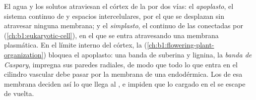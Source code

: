 \begin{definition}\label{def:b1:plant-water-minerals:pathways}
El agua y los solutos atraviesan el córtex de la  por dos vías: el
\emph{apoplasto}, el sistema continuo de  y espacios
intercelulares, por el que se desplazan sin atravesar ninguna membrana; y el
\emph{simplasto}, el  continuo de las  conectadas por
 (\cref{ch:b1:eukaryotic-cell}), en el que se entra atravesando
una membrana plasmática. En el límite interno del córtex, la
\emph{} (\cref{ch:b1:flowering-plant-organization}) bloquea el
apoplasto: una banda de suberina y lignina, la \emph{banda de Caspary},
impregna sus paredes radiales, de modo que todo lo que entra en el cilindro
vascular debe pasar por la membrana de una  endodérmica. Los
 de esa membrana deciden así lo que llega al , e
impiden que lo cargado en el  se escape de vuelta.
\end{definition}

